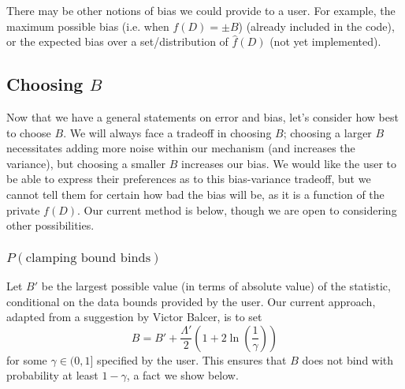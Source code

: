 \documentclass[11pt]{scrartcl} %
\begin{document}
There may be other notions of bias we could provide to a user. For example, the maximum possible bias
(i.e. when $f(D) = \pm B$) (already included in the code), or the expected bias over a set/distribution of $\hat{f}(D)$ (not
yet implemented).

\subsection{Choosing $B$}
\label{subsec:choosing_B}
Now that we have a general statements on error and bias, let's consider how best to choose $B$.
We will always face a tradeoff in choosing $B$; choosing a larger $B$ necessitates adding more noise within
our mechanism (and increases the variance), but choosing a smaller $B$ increases our bias.
We would like the user to be able to express their preferences as to this bias-variance tradeoff,
but we cannot tell them for certain how bad the bias will be, as it is a function of the private $f(D)$.
Our current method is below, though we are open to considering other possibilities.

\subsubsection{$P(\text{clamping bound binds})$}
\label{subsubsec:p_clamp_bound_binds}
Let $B'$ be the largest possible value (in terms of absolute value) of the statistic, conditional on the data bounds provided
by the user. Our current approach, adapted from a suggestion by Victor Balcer, is to set
\[ B = B' + \frac{\Lambda'}{2} \left(1 + 2\ln \left( \frac{1}{\gamma} \right) \right) \]
for some $\gamma \in (0,1]$ specified by the user. This ensures that $B$ does not bind with probability at least $1 - \gamma$,
a fact we show below. \newline
\end{document}
